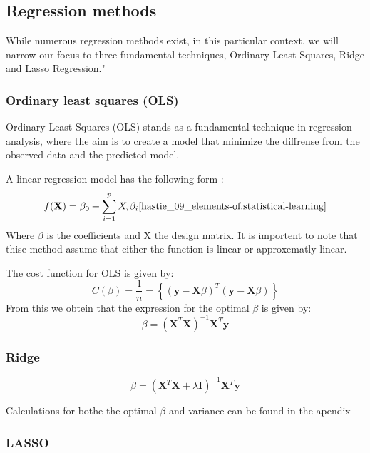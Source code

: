 \thispagestyle{plain}

\subsection{Regression methods}
\noindent While numerous regression methods exist, in this particular context, 
we will narrow our focus to three fundamental techniques, Ordinary Least Squares, Ridge and Lasso Regression."
\subsubsection{Ordinary least squares (OLS)}
\noindent Ordinary Least Squares (OLS) stands as a fundamental technique in regression
analysis, where the aim is to create a model that minimize the diffrense from
the observed data and the predicted model. 


A linear regression model has the following form :
\begin{align}
    f(\textbf{X}) = \beta_0 + \sum^{p}_{i=1} X_i \beta_i \cite{hastie_09_elements-of.statistical-learning}
\end{align}
Where $\beta$ is the coefficients and X the design matrix. It is importent to note 
that thise method assume that either the function is linear or approxematly linear.

 
The cost function for OLS is given by:
\begin{equation}
    C(\beta) = \frac{1}{n} = \left\lbrace ( \textbf{y} - \textbf{X}\beta  )^T (\textbf{y} - \textbf{X}\beta)\right\rbrace
\end{equation}
From this we obtein that the expression for the optimal $\beta$ is given by:
\begin{equation}
    \beta = (\textbf{X}^T \textbf{X})^{-1}\textbf{X}^T \textbf{y}
\end{equation}
\subsubsection{Ridge}
\begin{equation}
    \beta = (\textbf{X}^T \textbf{X} + \lambda \textbf{I})^{-1}\textbf{X}^T \textbf{y}
\end{equation}

Calculations for bothe the optimal $\beta$ and variance can be found in the apendix
\subsubsection{LASSO}

